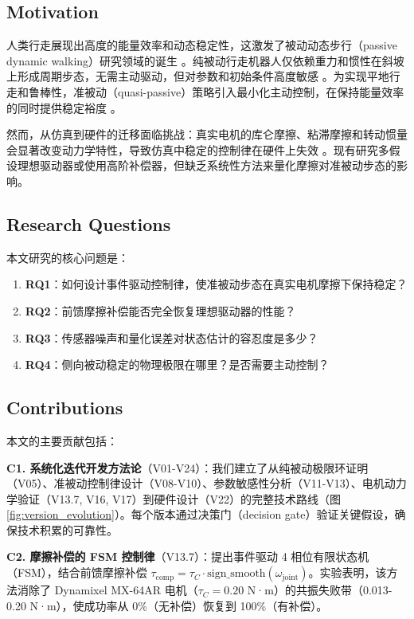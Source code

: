 
\subsection{Motivation}

人类行走展现出高度的能量效率和动态稳定性，这激发了被动动态步行（passive dynamic walking）研究领域的诞生 \cite{McGeer1990}。纯被动行走机器人仅依赖重力和惯性在斜坡上形成周期步态，无需主动驱动，但对参数和初始条件高度敏感 \cite{Goswami1996,Goswami1998}。为实现平地行走和鲁棒性，准被动（quasi-passive）策略引入最小化主动控制，在保持能量效率的同时提供稳定裕度 \cite{Collins2005,Spong2005}。

然而，从仿真到硬件的迁移面临挑战：真实电机的库仑摩擦、粘滞摩擦和转动惯量会显著改变动力学特性，导致仿真中稳定的控制律在硬件上失效 \cite{Wisse2007}。现有研究多假设理想驱动器或使用高阶补偿器，但缺乏系统性方法来量化摩擦对准被动步态的影响。

\subsection{Research Questions}

本文研究的核心问题是：
\begin{enumerate}
    \item \textbf{RQ1}：如何设计事件驱动控制律，使准被动步态在真实电机摩擦下保持稳定？
    \item \textbf{RQ2}：前馈摩擦补偿能否完全恢复理想驱动器的性能？
    \item \textbf{RQ3}：传感器噪声和量化误差对状态估计的容忍度是多少？
    \item \textbf{RQ4}：侧向被动稳定的物理极限在哪里？是否需要主动控制？
\end{enumerate}

\subsection{Contributions}

本文的主要贡献包括：

\textbf{C1. 系统化迭代开发方法论}（V01-V24）：我们建立了从纯被动极限环证明（V05）、准被动控制律设计（V08-V10）、参数敏感性分析（V11-V13）、电机动力学验证（V13.7, V16, V17）到硬件设计（V22）的完整技术路线（图 \ref{fig:version_evolution}）。每个版本通过决策门（decision gate）验证关键假设，确保技术积累的可靠性。

\textbf{C2. 摩擦补偿的 FSM 控制律}（V13.7）：提出事件驱动 4 相位有限状态机（FSM），结合前馈摩擦补偿 $\tau_{\text{comp}} = \tau_C \cdot \text{sign\_smooth}(\omega_{\text{joint}})$。实验表明，该方法消除了 Dynamixel MX-64AR 电机（$\tau_C = 0.20$ N·m）的共振失败带（0.013-0.20 N·m），使成功率从 0\%（无补偿）恢复到 100\%（有补偿）。

